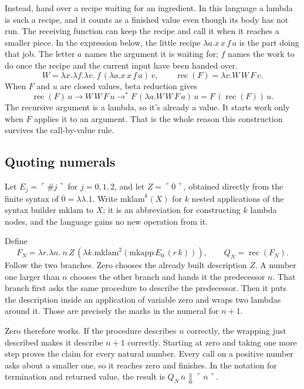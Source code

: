 \documentclass[11pt,twoside]{article}
\theoremstyle{thielethm}
\theoremstyle{thieledef}
\theoremstyle{thieledef}
\theoremstyle{thieledef}
\theoremstyle{thielethm}
\theoremstyle{thieleobs}
\theoremstyle{thielethm}
\begin{document}
Instead, hand over a recipe waiting for an ingredient. In this language a
lambda is such a recipe, and it counts as a finished value even though its
body has not run. The receiving function can keep the recipe and call it when
it reaches a smaller piece. In the expression below, the little recipe
$\lambda a.x\,x\,f\,a$ is the part doing that job. The letter $a$ names the
argument it is waiting for; $f$ names the work to do once the recipe and the
current input have been handed over.
\[
W=\lambda x.\lambda f.\lambda v.\ f\,(\lambda a.x\,x\,f\,a)\,v,
\qquad
\operatorname{rec}(F)=\lambda v.W\,W\,F\,v.
\]
When $F$ and $u$ are closed values, beta reduction gives
\[
\operatorname{rec}(F)\,u
\longrightarrow W\,W\,F\,u
\longrightarrow^{*} F\,(\lambda a.W\,W\,F\,a)\,u
=F\,(\operatorname{rec}(F))\,u.
\]
The recursive argument is a lambda, so it's already a value. It starts work only when
$F$ applies it to an argument. That is the whole reason this construction survives
the call-by-value rule.

\subsection{Quoting numerals}

Let $E_j=\ulcorner\#j\urcorner$ for $j=0,1,2$, and let
$Z=\ulcorner\overline0\urcorner$, obtained directly from the finite syntax of
$\overline0=\lambda\lambda.1$. Write $\mathrm{mklam}^k(X)$ for $k$ nested applications of the
syntax builder $\mathrm{mklam}$ to $X$; it is an abbreviation for constructing $k$ lambda nodes, and the
language gains no new operation from it.

Define
\[
F_N=\lambda r.\lambda n.\ n\,Z\,
       (\lambda k.\mathrm{mklam}^2(\mathrm{mkapp}\,E_0\,(r\,k))),
\qquad Q_N=\operatorname{rec}(F_N).
\]
Follow the two branches. Zero chooses the already built description $Z$.
A number one larger than $n$ chooses the other branch and hands it the
predecessor $n$. That branch first asks the same procedure to describe the
predecessor. Then it puts the description inside an application of variable
zero and wraps two lambdas around it. Those are precisely the marks in the
numeral for $n+1$.

Zero therefore works. If the procedure describes $n$ correctly, the wrapping
just described makes it describe $n+1$ correctly. Starting at zero and taking
one more step proves the claim for every natural number. Every call on a
positive number asks about a smaller one, so it reaches zero and finishes.
In the notation for termination and returned value, the result is
$Q_N\,\overline n\Downarrow\ulcorner\overline n\urcorner$.
\end{document}
